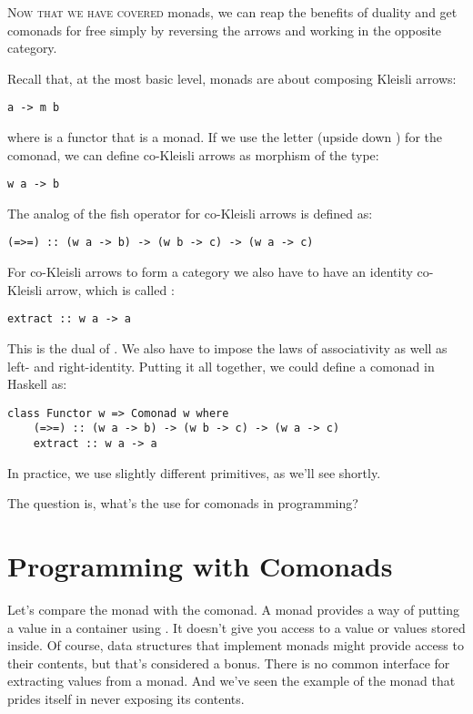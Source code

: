 \lettrine[lhang=0.17]{N}{ow that we have covered} monads, we can reap the benefits of duality and
get comonads for free simply by reversing the arrows and working in the
opposite category.

Recall that, at the most basic level, monads are about composing Kleisli
arrows:

\begin{Verbatim}
a -> m b
\end{Verbatim}
where  is a functor that is a monad. If we use the letter
 (upside down ) for the comonad, we can define
co-Kleisli arrows as morphism of the type:

\begin{Verbatim}
w a -> b
\end{Verbatim}
The analog of the fish operator for co-Kleisli arrows is defined as:

\begin{Verbatim}
(=>=) :: (w a -> b) -> (w b -> c) -> (w a -> c)
\end{Verbatim}
For co-Kleisli arrows to form a category we also have to have an
identity co-Kleisli arrow, which is called :

\begin{Verbatim}
extract :: w a -> a
\end{Verbatim}
This is the dual of . We also have to impose the laws of
associativity as well as left- and right-identity. Putting it all
together, we could define a comonad in Haskell as:

\begin{Verbatim}
class Functor w => Comonad w where
    (=>=) :: (w a -> b) -> (w b -> c) -> (w a -> c)
    extract :: w a -> a
\end{Verbatim}
In practice, we use slightly different primitives, as we'll see shortly.

The question is, what's the use for comonads in programming?

\section{Programming with Comonads}

Let's compare the monad with the comonad. A monad provides a way of
putting a value in a container using . It doesn't give
you access to a value or values stored inside. Of course, data
structures that implement monads might provide access to their contents,
but that's considered a bonus. There is no common interface for
extracting values from a monad. And we've seen the example of the
 monad that prides itself in never exposing its contents.

